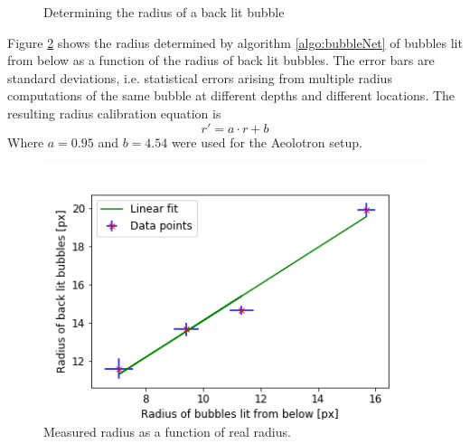 \begin{figure}
				\caption{Determining the radius of a back lit bubble}								
				\label{fig:green_radius}
			\end{figure}
			
			Figure \ref{fig:radius_calib_result} shows the radius determined by algorithm \ref{algo:bubbleNet} of bubbles lit from below as a function of the radius of back lit bubbles. The error bars are standard deviations, i.e. statistical errors arising from multiple radius computations of the same bubble at different depths and different locations. The resulting radius calibration equation is 
			\begin{equation}
				r' = a \cdot r + b
				\label{eq:radius_calib}
			\end{equation}
			Where $a= 0.95$ and $b=4.54$ were used for the Aeolotron setup. 
			
			\begin{figure}
				\centering
				\includegraphics[scale=.6]{graphs/radius_calibration_result.png}
				\caption{Measured radius as a function of real radius.}
				\label{fig:radius_calib_result}
			\end{figure}
			
			
			
			
			
































